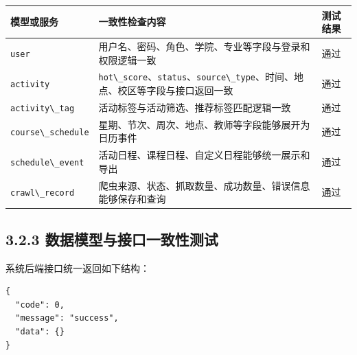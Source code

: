{\def\LTcaptype{none} %
\begin{longtable}[]{@{}|
  >{\raggedright\arraybackslash}p{}|
  >{\raggedright\arraybackslash}p{}|
  >{\raggedright\arraybackslash}p{}|@{}}
\hline
\rowcolor{gray!12}
\begin{minipage}[b]{\linewidth}\raggedright
\bfseries 模型或服务
\end{minipage} & \begin{minipage}[b]{\linewidth}\raggedright
\bfseries 一致性检查内容
\end{minipage} & \begin{minipage}[b]{\linewidth}\raggedright
\bfseries 测试结果
\end{minipage} \\
\hline
\endhead
\hline
\endlastfoot
\passthrough{\lstinline!user!} &
用户名、密码、角色、学院、专业等字段与登录和权限逻辑一致 & 通过 \\
\hline
\passthrough{\lstinline!activity!} &
\passthrough{\lstinline!hot\_score!}、\passthrough{\lstinline!status!}、\passthrough{\lstinline!source\_type!}、时间、地点、校区等字段与接口返回一致
& 通过 \\
\hline
\passthrough{\lstinline!activity\_tag!} &
活动标签与活动筛选、推荐标签匹配逻辑一致 & 通过 \\
\hline
\passthrough{\lstinline!course\_schedule!} &
星期、节次、周次、地点、教师等字段能够展开为日历事件 & 通过 \\
\hline
\passthrough{\lstinline!schedule\_event!} &
活动日程、课程日程、自定义日程能够统一展示和导出 & 通过 \\
\hline
\passthrough{\lstinline!crawl\_record!} &
爬虫来源、状态、抓取数量、成功数量、错误信息能够保存和查询 & 通过 \\
\hline
\end{longtable}
}

\subsection{3.2.3
数据模型与接口一致性测试}\label{ux6570ux636eux6a21ux578bux4e0eux63a5ux53e3ux4e00ux81f4ux6027ux6d4bux8bd5}

系统后端接口统一返回如下结构：

\begin{lstlisting}
{
  "code": 0,
  "message": "success",
  "data": {}
}
\end{lstlisting}

